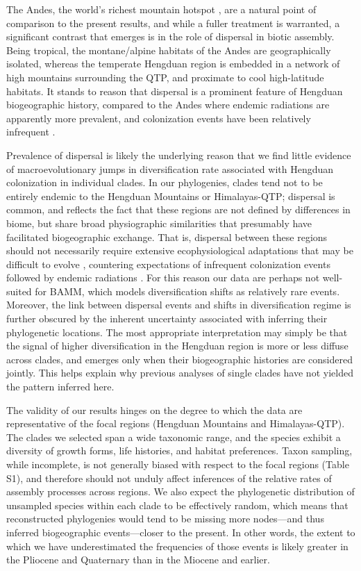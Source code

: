 The Andes, the world's richest mountain hotspot \citep{hughes2016},
are a natural point of comparison to the present results, and while a
fuller treatment is warranted, a significant contrast that emerges is
in the role of dispersal in biotic assembly. Being tropical, the
montane/alpine habitats of the Andes are geographically isolated,
whereas the temperate Hengduan region is embedded in a network of high
mountains surrounding the QTP, and proximate to cool high-latitude
habitats. It stands to reason that dispersal is a prominent feature of
Hengduan biogeographic history, compared to the Andes where endemic
radiations are apparently more prevalent, and colonization events have
been relatively infrequent
\citep[e.g.,][]{pennington2010,Lagomarsino2016,Hughes2015,Luebert2014,Hughes2006}.

Prevalence of dispersal is likely the underlying reason that we find
little evidence of macroevolutionary jumps in diversification rate
associated with Hengduan colonization in individual clades. In our
phylogenies, clades tend not to be entirely endemic to the Hengduan
Mountains or Himalayas-QTP; dispersal is common, and reflects the fact
that these regions are not defined by differences in biome, but share
broad physiographic similarities that presumably have facilitated
biogeographic exchange. That is, dispersal between these regions
should not necessarily require extensive ecophysiological adaptations
that may be difficult to evolve \citep{Donoghue2014}, countering
expectations of infrequent colonization events followed by endemic
radiations \citep[cf.][]{Hughes2006}. For this reason our data are
perhaps not well-suited for BAMM, which models diversification shifts
as relatively rare events. Moreover, the link between dispersal events
and shifts in diversification regime is further obscured by the
inherent uncertainty associated with inferring their phylogenetic
locations. The most appropriate interpretation may simply be that the
signal of higher diversification in the Hengduan region is more or
less diffuse across clades, and emerges only when their biogeographic
histories are considered jointly. This helps explain why previous
analyses of single clades have not yielded the pattern inferred here.

The validity of our results hinges on the degree to which the data are
representative of the focal regions (Hengduan Mountains and
Himalayas-QTP). The clades we selected span a wide taxonomic range,
and the species exhibit a diversity of growth forms, life histories,
and habitat preferences. Taxon sampling, while incomplete, is not
generally biased with respect to the focal regions (Table S1), and
therefore should not unduly affect inferences of the relative rates of
assembly processes across regions. We also expect the phylogenetic
distribution of unsampled species within each clade to be effectively
random, which means that reconstructed phylogenies would tend to be
missing more nodes---and thus inferred biogeographic events---closer
to the present. In other words, the extent to which we have
underestimated the frequencies of those events is likely greater in
the Pliocene and Quaternary than in the Miocene and earlier.

